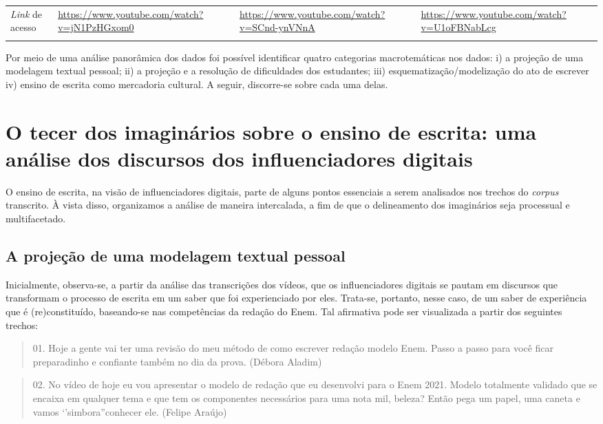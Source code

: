 \documentclass[portuguese]{textolivre}
\begin{document}
\begin{table}[htbp]
\begin{threeparttable}
\begin{tabular}{p{2.5cm} p{3.5cm} p{3.5cm} p{3.5cm}}
\midrule
\emph{Link} de acesso & \url{https://www.youtube.com/watch?v=jN1PzHGxom0} & \url{https://www.youtube.com/watch?v=SCnd-ynVNnA} & \url{https://www.youtube.com/watch?v=U1oFBNabLcg} \\
\arrayrulecolor{black}
\bottomrule
\end{tabular}
\end{threeparttable}
\end{table}

Por meio de uma análise panorâmica dos dados foi possível identificar quatro categorias macrotemáticas nos dados: i) a projeção de uma modelagem textual pessoal; ii) a projeção e a resolução de dificuldades dos estudantes; iii) esquematização/modelização do ato de escrever iv) ensino de escrita como mercadoria cultural. A seguir, discorre-se sobre cada uma delas.

\section{O tecer dos imaginários sobre o ensino de escrita: uma análise dos discursos dos influenciadores digitais}\label{sec-modelo}
O ensino de escrita, na visão de influenciadores digitais, parte de alguns pontos essenciais a serem analisados nos trechos do \textit{corpus} transcrito. À vista disso, organizamos a análise de maneira intercalada, a fim de que o delineamento dos imaginários seja processual e multifacetado. 

\subsection{A projeção de uma modelagem textual pessoal }\label{sec-organizacao}
Inicialmente, observa-se, a partir da análise das transcrições dos vídeos, que os influenciadores digitais se pautam em discursos que transformam o processo de escrita em um saber que foi experienciado por eles. Trata-se, portanto, nesse caso, de um saber de experiência que é (re)constituído, baseando-se nas competências da redação do Enem. Tal afirmativa pode ser visualizada a partir dos seguintes trechos: 

\begin{quote}
    01. Hoje a gente vai ter uma revisão do meu método de como escrever redação modelo Enem. Passo a passo para você ficar preparadinho e confiante também no dia da prova. (Débora Aladim)
\end{quote}

\begin{quote}
    02. No vídeo de hoje eu vou apresentar o modelo de redação que eu desenvolvi para o Enem 2021. Modelo totalmente validado que se encaixa em qualquer tema e que tem os componentes necessários para uma nota mil, beleza? Então pega um papel, uma caneta e vamos ‘'simbora''conhecer ele. (Felipe Araújo)
\end{quote}
\end{document}
